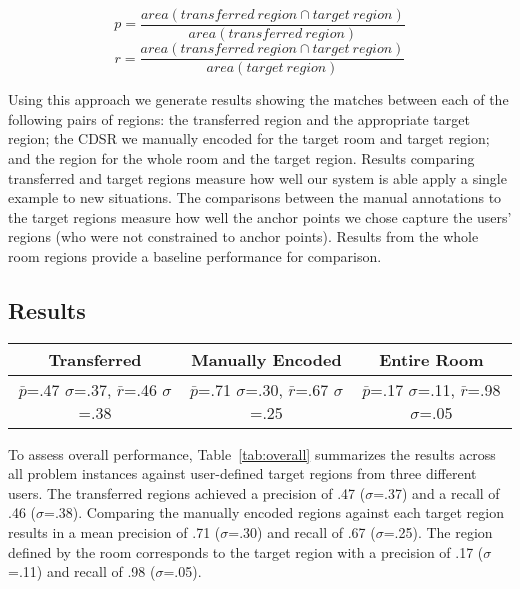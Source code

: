 \begin{equation}
	p=\frac{area(transferred\ region \cap target\ region)}{area(transferred\ region)}
\end{equation}
\begin{equation}
	r=\frac{area(transferred\ region \cap target\ region)}{area(target\ region)}
\end{equation}

Using this approach we generate results showing the matches between each of the following pairs of regions: the transferred region and the appropriate target region; the CDSR we manually encoded for the target room and target region; and the region for the whole room and the target region. 
Results comparing transferred and target regions measure how well our system is able apply a single example to new situations. The comparisons between the manual annotations to the target regions measure how well the anchor points we chose capture the users' regions (who were not constrained to anchor points). Results from the whole room regions provide a baseline performance for comparison. 


\subsection{Results}
\begin{table*}
	\center
\begin{tabular}{|c|c|c|}
\hline
Transferred & Manually Encoded & Entire Room \\
\hline
$\bar{p}$=.47 $\sigma$=.37, $\bar{r}$=.46 $\sigma$=.38 & $\bar{p}$=.71 $\sigma$=.30, $\bar{r}$=.67 $\sigma$=.25 & $\bar{p}$=.17 $\sigma$=.11, $\bar{r}$=.98 $\sigma$=.05  \\
\hline
\end{tabular}
\caption{Overall Performance Compared Against Target Regions Defined by Three Users}
  \label{tab:overall}	

\end{table*}

To assess overall performance, Table~\ref{tab:overall} summarizes the results across all problem instances against user-defined target regions from three different users. The transferred regions achieved a precision of .47 ($\sigma$=.37) and a recall of .46 ($\sigma$=.38). Comparing the manually encoded regions against each target region results in a mean precision of .71 ($\sigma$=.30) and recall of .67 ($\sigma$=.25). The region defined by the room corresponds to the target region with a precision of .17 ($\sigma$=.11) and recall of .98 ($\sigma$=.05).

